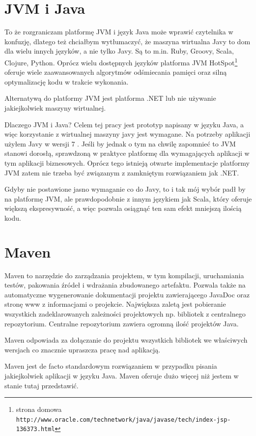 \documentclass[a4paper,onecolumn,oneside,11pt,wide,floatssmall]{mwrep}
\def\url#1{{ \tt #1}}
\theoremstyle{definition}
\theoremstyle{plain}%
\theoremstyle{remark}
\begin{document}
\section{JVM i Java}
To że rozgraniczam platformę JVM i język Java może wprawić czytelnika w konfuzję, dlatego też chciałbym wytłumaczyć, 
że maszyna wirtualna Javy to dom dla wielu innych języków, a nie tylko Javy. Są to m.in. Ruby, Groovy, Scala, Clojure, Python. 
Oprócz wielu dostępnych języków platforma JVM HotSpot\footnote{strona domowa \url{http://www.oracle.com/technetwork/java/javase/tech/index-jsp-136373.html}} oferuje wiele zaawansowanych algorytmów odśmiecania pamięci oraz silną optymalizację kodu w trakcie wykonania.

Alternatywą do platformy JVM jest platforma .NET lub nie używanie jakiejkolwiek maszyny wirtualnej.

Dlaczego JVM i Java? Celem tej pracy jest prototyp napisany w języku Java, a więc korzystanie z wirtualnej maszyny 
javy jest wymagane. Na potrzeby aplikacji użyłem Javy w wersji 7 \cite{java7seHome}.
Jeśli by jednak o tym na chwilę zapomnieć to JVM stanowi dorosłą, sprawdzoną w praktyce platformę dla wymagających 
aplikacji w tym aplikacji biznesowych. Oprócz tego istnieją otwarte implementacje platformy JVM zatem nie trzeba być 
związanym z zamkniętym rozwiązaniem jak .NET.

Gdyby nie postawione jasno wymaganie co do Javy, to i tak mój wybór padł by na platformę JVM, ale prawdopodobnie z 
innym językiem jak Scala\cite{scalaLangHome}, który oferuje większą ekspresywność, a więc pozwala osiągnąć ten sam efekt mniejszą ilością kodu.

\section{Maven}
Maven to narzędzie do zarządzania projektem, w tym kompilacji, uruchamiania testów, pakowania źródeł i wdrażania 
zbudowanego artefaktu. Pozwala także na automatyczne wygenerowanie dokumentacji projektu zawierającego JavaDoc oraz 
stronę www z informacjami o projekcie. Największa zaletą jest pobieranie wszystkich zadeklarowanych zależności 
projektowych np. bibliotek z centralnego repozytorium. Centralne repozytorium zawiera ogromną ilość projektów Java. 

Maven odpowiada za dołączanie do projektu wszystkich bibliotek we właściwych wersjach co znacznie 
upraszcza pracę nad aplikacją.  

Maven jest de facto standardowym rozwiązaniem w przypadku pisania jakiejkolwiek aplikacji w języku Java. Maven oferuje dużo więcej niż jestem w stanie tutaj przedstawić.
\end{document}
